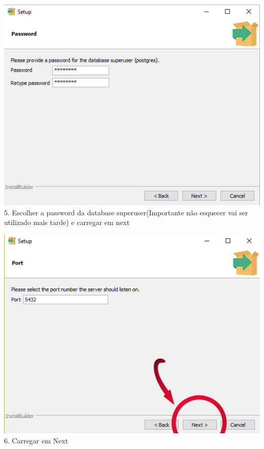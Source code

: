 \documentclass[a4paper, 11pt]{article}
\begin{document}
\begin{minipage}{0.45\textwidth}
  \includegraphics[width=\textwidth]{Screenshot-4109.png}  
  5. Escolher a password da database superuser(Importante não esquecer vai ser utilizado mais tarde) e carregar em next
\end{minipage}\hfill
\begin{minipage}{0.45\textwidth}
  \includegraphics[width=\textwidth]{image.psd(4).png}
  6. Carregar em Next
\end{minipage}
\end{document}
